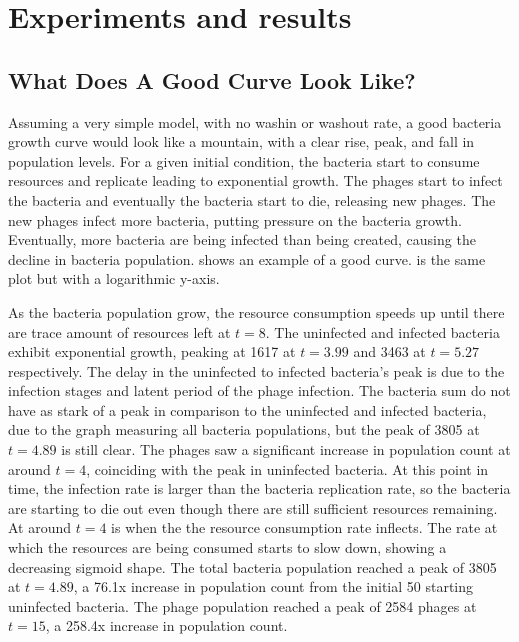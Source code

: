 \chapter{Experiments and results}
\label{AER}

\section{What Does A Good Curve Look Like?}
Assuming a very simple model, with no washin or washout rate, a good bacteria growth curve would look like a mountain, with a clear rise, peak, and fall in population levels. 
For a given initial condition, the bacteria start to consume resources and replicate leading to exponential growth. 
The phages start to infect the bacteria and eventually the bacteria start to die, releasing new phages. 
The new phages infect more bacteria, putting pressure on the bacteria growth. 
Eventually, more bacteria are being infected than being created, causing the decline in bacteria population. 
 shows an example of a good curve. 
 is the same plot but with a logarithmic y-axis. 

As the bacteria population grow, the resource consumption speeds up until there are trace amount of resources left at $t=8$. 
The uninfected and infected bacteria exhibit exponential growth, peaking at 1617 at $t=3.99$ and 3463 at $t=5.27$ respectively. 
The delay in the uninfected to infected bacteria's peak is due to the infection stages and latent period of the phage infection. 
The bacteria sum do not have as stark of a peak in comparison to the uninfected and infected bacteria, due to the graph measuring all bacteria populations, but the peak of 3805 at $t=4.89$ is still clear. 
The phages saw a significant increase in population count at around $t=4$, coinciding with the peak in uninfected bacteria. 
At this point in time, the infection rate is larger than the bacteria replication rate, so the bacteria are starting to die out even though there are still sufficient resources remaining. 
At around $t=4$ is when the the resource consumption rate inflects. 
The rate at which the resources are being consumed starts to slow down, showing a decreasing sigmoid shape. 
The total bacteria population reached a peak of 3805 at $t=4.89$, a 76.1x increase in population count from the initial 50 starting uninfected bacteria. 
The phage population reached a peak of 2584 phages at $t=15$, a 258.4x increase in population count. 

